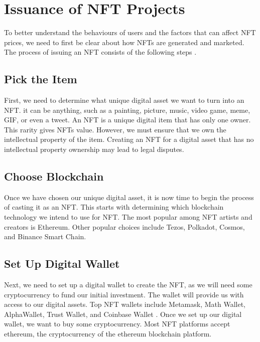 \section{Issuance of NFT Projects}

To better understand the behaviours of users and the factors that can affect NFT prices, we need to first be clear about how NFTs are generated and marketed. The process of issuing an NFT consists of the following steps \cite{how2makenfts}.

\subsection{Pick the Item}
First, we need to determine what unique digital asset we want to turn into an NFT. it can be anything, such as a painting, picture, music, video game, meme, GIF, or even a tweet. An NFT is a unique digital item that has only one owner. This rarity gives NFTs value. However, we must ensure that we own the intellectual property of the item. Creating an NFT for a digital asset that has no intellectual property ownership may lead to legal disputes.

\subsection{Choose Blockchain}
Once we have chosen our unique digital asset, it is now time to begin the process of casting it as an NFT. This starts with determining which blockchain technology we intend to use for NFT. The most popular among NFT artists and creators is Ethereum. Other popular choices include Tezos, Polkadot, Cosmos, and Binance Smart Chain.

\subsection{Set Up Digital Wallet}
Next, we need to set up a digital wallet to create the NFT, as we will need some cryptocurrency to fund our initial investment. The wallet will provide us with access to our digital assets. Top NFT wallets include Metamask, Math Wallet, AlphaWallet, Trust Wallet, and Coinbase Wallet \cite{how2makenfts}.
Once we set up our digital wallet, we want to buy some cryptocurrency. Most NFT platforms accept ethereum, the cryptocurrency of the ethereum blockchain platform.

